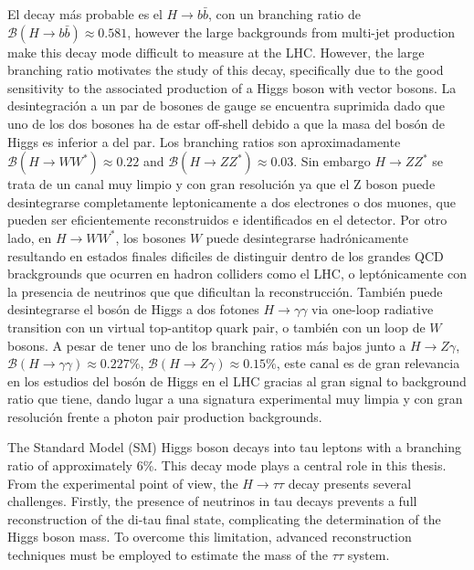 \documentclass[11pt,twoside]{book}
\begin{document}
El decay más probable es el $H\rightarrow b\bar{b}$, con un branching ratio de $\mathcal{B}(H\rightarrow b\bar{b})\approx0.581$, however the large backgrounds from multi-jet production make this decay mode difficult to measure at the LHC. However, the large branching ratio motivates the study of this decay, specifically due to the good sensitivity to the associated production of a Higgs boson with vector bosons. 
La desintegración a un par de bosones de gauge se encuentra suprimida dado que uno de los dos bosones ha de estar off-shell debido a que la masa del bosón de Higgs es inferior a del par. Los branching ratios son aproximadamente  $\mathcal{B}(H\rightarrow WW^*)\approx0.22$ and $\mathcal{B}(H\rightarrow ZZ^*)\approx0.03$. Sin embargo $H\rightarrow ZZ^*$ se trata de un canal muy limpio y con gran resolución ya que el Z boson puede desintegrarse completamente leptonicamente a dos electrones o dos muones, que pueden ser eficientemente reconstruidos e identificados en el detector. Por otro lado, en $H\rightarrow WW^*$, los bosones $W$ puede desintegrarse hadrónicamente resultando en estados finales dificiles de distinguir dentro de los grandes \acrshort{QCD} brackgrounds que ocurren en hadron colliders como el LHC, o leptónicamente con la presencia de neutrinos que que dificultan la reconstrucción.
También puede desintegrarse el bosón de Higgs a dos fotones $H\rightarrow \gamma\gamma$ via one-loop radiative transition con un virtual top-antitop quark pair, o también con un loop de $W$ bosons. A pesar de tener uno de los branching ratios más bajos junto a $H\rightarrow Z\gamma$, $\mathcal{B}(H\rightarrow \gamma\gamma)\approx0.227\%$, $\mathcal{B}(H\rightarrow Z\gamma)\approx0.15\%$, este canal es de gran relevancia en los estudios del bosón de Higgs en el LHC gracias al gran signal to background ratio que tiene, dando lugar a una signatura experimental muy limpia y con gran resolución frente a photon pair production backgrounds.

The Standard Model (\acrshort{SM}) Higgs boson decays into tau leptons with a branching ratio of approximately 6\%. This decay mode plays a central role in this thesis. From the experimental point of view, the $H \rightarrow \tau\tau$ decay presents several challenges. Firstly, the presence of neutrinos in tau decays prevents a full reconstruction of the di-tau final state, complicating the determination of the Higgs boson mass. To overcome this limitation, advanced reconstruction techniques must be employed to estimate the mass of the $\tau\tau$ system.
\end{document}

